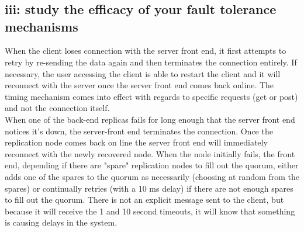 \documentclass[12pt,letter]{article}
\begin{document}
\onehalfspacing
\section*{}
\subsection*{iii: study the efficacy of your fault tolerance mechanisms}
When the client loses connection with the server front end, it first attempts to retry by re-sending the data again and then terminates the connection entirely. If necessary, the user accessing the client is able to restart the client and it will reconnect with the server once the server front end comes back online. The timing mechanism comes into effect with regards to specific requests (get or post) and not the connection itself.\\

\onehalfspacing
When one of the back-end replicas fails for long enough that the server front end notices it's down, the server-front end terminates the connection. Once the replication node comes back on line the server front end will immediately reconnect with the newly recovered node. When the node initially fails, the front end, depending if there are "spare" replication nodes to fill out the quorum, either adds one of the spares to the quorum as necessarily (choosing at random from the spares) or continually retries (with a 10 ms delay) if there are not enough spares to fill out the quorum. There is not an explicit message sent to the client, but because it will receive the 1 and 10 second timeouts, it will know that something is causing delays in the system.
\end{document}
